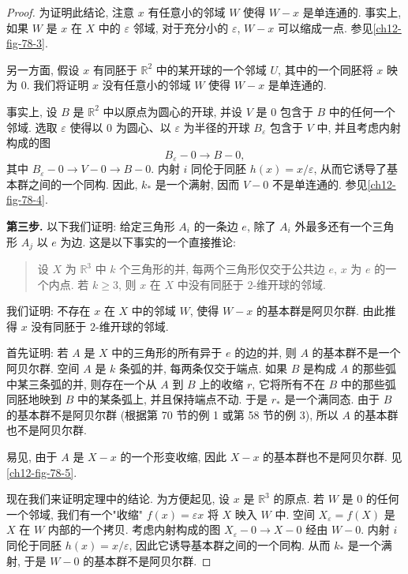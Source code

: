 \begin{proof}
为证明此结论, 注意 $x$ 有任意小的邻域 $W$ 使得 $W-x$ 是单连通的. 事实上, 如果 $W$ 是 $x$ 在 $X$ 中的 $\varepsilon$ 邻域, 对于充分小的 $\varepsilon$, $W-x$ 可以缩成一点. 参见\cref{ch12-fig-78-3}.

另一方面, 假设 $x$ 有同胚于 $\mathbb{R}^{2}$ 中的某开球的一个邻域 $U$, 其中的一个同胚将 $x$ 映为 $0$. 我们将证明 $x$ 没有任意小的邻域 $W$ 使得 $W-x$ 是单连通的.

事实上, 设 $B$ 是 $\mathbb{R}^{2}$ 中以原点为圆心的开球, 并设 $V$ 是 $0$ 包含于 $B$ 中的任何一个邻域. 选取 $\varepsilon$ 使得以 $0$ 为圆心、以 $\varepsilon$ 为半径的开球 $B_{\varepsilon}$ 包含于 $V$ 中, 并且考虑内射构成的图
\[
B_{\varepsilon}-0\longrightarrow B-0,
\]
其中 $B_{\varepsilon}-0\to V-0\to B-0$. 内射 $i$ 同伦于同胚 $h(x)=x/\varepsilon$, 从而它诱导了基本群之间的一个同构. 因此, $k_{*}$ 是一个满射, 因而 $V-0$ 不是单连通的. 参见\cref{ch12-fig-78-4}.



\textbf{第三步.} 以下我们证明: 给定三角形 $A_{i}$ 的一条边 $e$, 除了 $A_{i}$ 外最多还有一个三角形 $A_{j}$ 以 $e$ 为边. 这是以下事实的一个直接推论:

\begin{quote}
设 $X$ 为 $\mathbb{R}^{3}$ 中 $k$ 个三角形的并, 每两个三角形仅交于公共边 $e$, $x$ 为 $e$ 的一个内点. 若 $k\geqslant 3$, 则 $x$ 在 $X$ 中没有同胚于 $2$-维开球的邻域.
\end{quote}

我们证明: 不存在 $x$ 在 $X$ 中的邻域 $W$, 使得 $W-x$ 的基本群是阿贝尔群. 由此推得 $x$ 没有同胚于 $2$-维开球的邻域.

首先证明: 若 $A$ 是 $X$ 中的三角形的所有异于 $e$ 的边的并, 则 $A$ 的基本群不是一个阿贝尔群. 空间 $A$ 是 $k$ 条弧的并, 每两条仅交于端点. 如果 $B$ 是构成 $A$ 的那些弧中某三条弧的并, 则存在一个从 $A$ 到 $B$ 上的收缩 $r$, 它将所有不在 $B$ 中的那些弧同胚地映到 $B$ 中的某条弧上, 并且保持端点不动. 于是 $r_{*}$ 是一个满同态. 由于 $B$ 的基本群不是阿贝尔群 (根据第 70 节的例 1 或第 58 节的例 3), 所以 $A$ 的基本群也不是阿贝尔群.

易见, 由于 $A$ 是 $X-x$ 的一个形变收缩, 因此 $X-x$ 的基本群也不是阿贝尔群. 见\cref{ch12-fig-78-5}.


现在我们来证明定理中的结论. 为方便起见, 设 $x$ 是 $\mathbb{R}^{3}$ 的原点. 若 $W$ 是 $0$ 的任何一个邻域, 我们有一个"收缩" $f(x)=\varepsilon x$ 将 $X$ 映入 $W$ 中. 空间 $X_{\varepsilon}=f(X)$ 是 $X$ 在 $W$ 内部的一个拷贝. 考虑内射构成的图 $X_{\varepsilon}-0\to X-0$ 经由 $W-0$. 内射 $i$ 同伦于同胚 $h(x)=x/\varepsilon$, 因此它诱导基本群之间的一个同构. 从而 $k_{*}$ 是一个满射, 于是 $W-0$ 的基本群不是阿贝尔群.
\end{proof}

